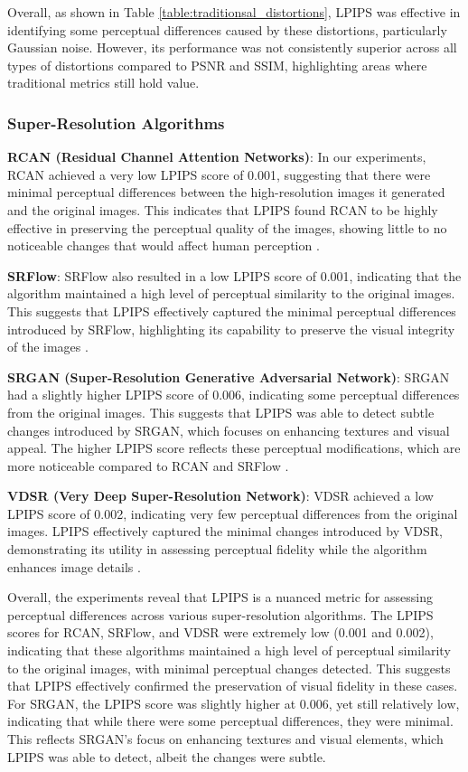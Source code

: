 \documentclass[a4paper,12pt]{article}
\begin{document}
Overall, as shown in Table \ref{table:traditionsal_distortions}, LPIPS was effective in identifying some perceptual differences caused by these distortions, particularly Gaussian noise. However, its performance was not consistently superior across all types of distortions compared to PSNR and SSIM, highlighting areas where traditional metrics still hold value.

\subsubsection{Super-Resolution Algorithms}


\textbf{RCAN (Residual Channel Attention Networks)}:
In our experiments, RCAN achieved a very low LPIPS score of 0.001, suggesting that there were minimal perceptual differences between the high-resolution images it generated and the original images. This indicates that LPIPS found RCAN to be highly effective in preserving the perceptual quality of the images, showing little to no noticeable changes that would affect human perception \cite{zhang_image_2018}.

\textbf{SRFlow}:
SRFlow also resulted in a low LPIPS score of 0.001, indicating that the algorithm maintained a high level of perceptual similarity to the original images. This suggests that LPIPS effectively captured the minimal perceptual differences introduced by SRFlow, highlighting its capability to preserve the visual integrity of the images \cite{lugmayr_srflow_2020}.

\textbf{SRGAN (Super-Resolution Generative Adversarial Network)}:
SRGAN had a slightly higher LPIPS score of 0.006, indicating some perceptual differences from the original images. This suggests that LPIPS was able to detect subtle changes introduced by SRGAN, which focuses on enhancing textures and visual appeal. The higher LPIPS score reflects these perceptual modifications, which are more noticeable compared to RCAN and SRFlow \cite{ledig_photo-realistic_2017}.

\textbf{VDSR (Very Deep Super-Resolution Network)}:
VDSR achieved a low LPIPS score of 0.002, indicating very few perceptual differences from the original images. LPIPS effectively captured the minimal changes introduced by VDSR, demonstrating its utility in assessing perceptual fidelity while the algorithm enhances image details \cite{kim_accurate_2016}.

Overall, the experiments reveal that LPIPS is a nuanced metric for assessing perceptual differences across various super-resolution algorithms. The LPIPS scores for RCAN, SRFlow, and VDSR were extremely low (0.001 and 0.002), indicating that these algorithms maintained a high level of perceptual similarity to the original images, with minimal perceptual changes detected. This suggests that LPIPS effectively confirmed the preservation of visual fidelity in these cases. For SRGAN, the LPIPS score was slightly higher at 0.006, yet still relatively low, indicating that while there were some perceptual differences, they were minimal. This reflects SRGAN's focus on enhancing textures and visual elements, which LPIPS was able to detect, albeit the changes were subtle.
\end{document}
